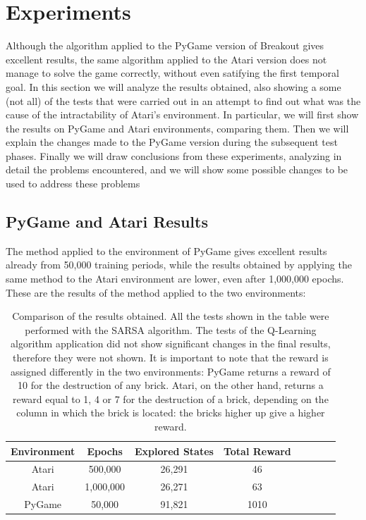 \section{Experiments}
\label{subsec:experiments}

Although the algorithm applied to the PyGame version of Breakout gives
excellent results, the same algorithm applied to the Atari version does not
manage to solve the game correctly, without even satifying the first
temporal goal.
In this section we will analyze the results obtained, also showing a some (not all) of the tests that were carried out in an attempt to find out what was the cause of the intractability of Atari's environment. In particular, we will first show the results on PyGame and Atari environments, comparing them. Then we will explain the changes made to the PyGame version during the subsequent test phases. Finally we will draw conclusions from these experiments, analyzing in detail the problems encountered, and we will show some possible changes to be used to address these problems

\subsection{PyGame and Atari Results}

The method applied to the environment of PyGame gives excellent results already from 50,000 training periods, while the results obtained by applying the same method to the Atari environment are lower, even after 1,000,000 epochs. These are the results of the method applied to the two environments:

\begin{table}
	\centering
	\begin{tabular}{*{8}{c}}
		Environment & Epochs & Explored States & Total Reward \\
		\hline
		Atari & 500,000 & 26,291 & 46 \\
		Atari & 1,000,000 & 26,271 & 63 \\
		\hline
		PyGame & 50,000 & 91,821 & 1010 \\
	\end{tabular}
	\caption{Comparison of the results obtained. All the tests shown in the table were performed with the SARSA algorithm. The tests of the Q-Learning algorithm application did not show significant changes in the final results, therefore they were not shown. It is important to note that the reward is assigned differently in the two environments: PyGame returns a reward of 10 for the destruction of any brick. Atari, on the other hand, returns a reward equal to 1, 4 or 7 for the destruction of a brick, depending on the column in which the brick is located: the bricks higher up give a higher reward.}
\end{table}


